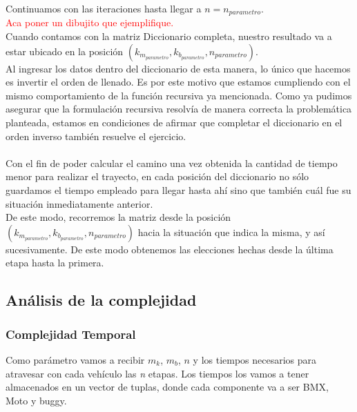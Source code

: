 Continuamos con las iteraciones hasta llegar a $n=n_{parametro}$.\\

\textcolor{red}{Aca poner un dibujito que ejemplifique.}\\

Cuando contamos con la matriz Diccionario completa, nuestro resultado va a estar ubicado en la posici\'on $(k_{m_{parametro}},k_{b_{parametro}},n_{parametro})$.\\

Al ingresar los datos dentro del diccionario de esta manera, lo \'unico que hacemos es invertir el orden de llenado. Es por este motivo que estamos cumpliendo con el mismo comportamiento de la funci\'on recursiva ya mencionada. Como ya pudimos asegurar que la formulaci\'on recursiva resolv\'ia de manera correcta la problem\'atica planteada, estamos en condiciones de afirmar que completar el diccionario en el orden inverso tambi\'en resuelve el ejercicio.\\
\\


Con el fin de poder calcular el camino una vez obtenida la cantidad de tiempo menor para realizar el trayecto, en cada posici\'on del diccionario no s\'olo guardamos el tiempo empleado para llegar hasta ah\'i sino que tambi\'en cu\'al fue su situaci\'on inmediatamente anterior.\\

De este modo, recorremos la matriz  desde la posici\'on $(k_{m_{parametro}},k_{b_{parametro}},n_{parametro})$ hacia la situaci\'on que indica la misma, y as\'i sucesivamente. De este modo obtenemos las elecciones hechas desde la \'ultima etapa hasta la primera.



\newpage

\subsection{An\'alisis de la complejidad}
\subsubsection{Complejidad Temporal}

Como par\'ametro vamos a recibir $m_k$, $m_b$, $n$ y los tiempos necesarios para atravesar con cada veh\'iculo las \emph{n} etapas. Los tiempos los vamos a tener almacenados en un vector de tuplas, donde cada componente va a ser BMX, Moto y buggy.\\

